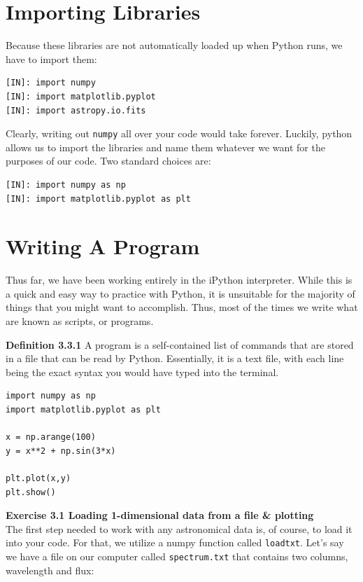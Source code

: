 \section{Importing Libraries}
Because these libraries are not automatically loaded up when Python runs, we have to import them:

\begin{lstlisting}
[IN]: import numpy
[IN]: import matplotlib.pyplot
[IN]: import astropy.io.fits
\end{lstlisting}

Clearly, writing out \texttt{numpy} all over your code would take forever. Luckily, python allows us to import the libraries and name them whatever we want for the purposes of our code. Two standard choices are:

\begin{lstlisting}
[IN]: import numpy as np
[IN]: import matplotlib.pyplot as plt
\end{lstlisting}

\section{Writing A Program}
Thus far, we have been working entirely in the iPython interpreter. While this is a quick and easy way to practice with Python, it is unsuitable for the majority of things that you might want to accomplish. Thus, most of the times we write what are known as scripts, or programs.

\textbf{Definition 3.3.1} A program is a self-contained list of commands that are stored in a file that can be read by Python. Essentially, it is a text file, with each line being the exact syntax you would have typed into the terminal.

\begin{lstlisting}
import numpy as np
import matplotlib.pyplot as plt

x = np.arange(100)
y = x**2 + np.sin(3*x)

plt.plot(x,y)
plt.show()
\end{lstlisting}

\textbf{Exercise 3.1 Loading 1-dimensional data from a file \& plotting} \\
The first step needed to work with any astronomical data is, of course, to load it into your code. For that, we utilize a numpy function called \texttt{loadtxt}. Let's say we have a file on our computer called \texttt{spectrum.txt} that contains two columns, wavelength and flux:

